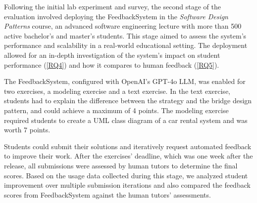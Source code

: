 \documentclass[sigconf,screen,review,anonymous]{acmart}
\begin{document}



Following the initial lab experiment and survey, the second stage of the evaluation involved deploying the FeedbackSystem in the \textit{Software Design Patterns} course, an advanced software engineering lecture with more than 500 active bachelor's and master's students.
This stage aimed to assess the system's performance and scalability in a real-world educational setting.
The deployment allowed for an in-depth investigation of the system's impact on student performance (\ref{RQ4}) and how it compares to human feedback (\ref{RQ5}).

The FeedbackSystem, configured with OpenAI's GPT-4o LLM, was enabled for two exercises, a modeling exercise and a text exercise.
In the text exercise, students had to explain the difference between the strategy and the bridge design pattern, and could achieve a maximum of 4 points.
The modeling exercise required students to create a UML class diagram of a car rental system and was worth 7 points. 

Students could submit their solutions and iteratively request automated feedback to improve their work.
After the exercises' deadline, which was one week after the release, all submissions were assessed by human tutors to determine the final scores.
Based on the usage data collected during this stage, we analyzed student improvement over multiple submission iterations and also compared the feedback scores from FeedbackSystem against the human tutors' assessments. 
\end{document}
